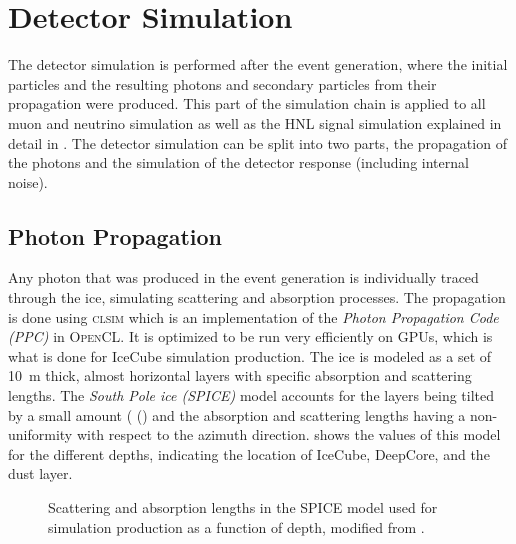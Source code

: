 \section{Detector Simulation}

The detector simulation is performed after the event generation, where the initial particles and the resulting photons and secondary particles from their propagation were produced. This part of the simulation chain is applied to all muon and neutrino simulation as well as the HNL signal simulation explained in detail in . The detector simulation can be split into two parts, the propagation of the photons and the simulation of the detector response (including internal noise).


\subsection{Photon Propagation} 

Any photon that was produced in the event generation is individually traced through the ice, simulating scattering and absorption processes.
The propagation is done using \textsc{clsim} \cite{clsim} which is an implementation of the \textit{Photon Propagation Code (\textsc{PPC})}  in \textsc{OpenCL}. It is optimized to be run very efficiently on GPUs, which is what is done for IceCube simulation production. The ice is modeled as a set of \SI{10}{\meter} thick, almost horizontal layers with specific absorption and scattering lengths. The \textit{South Pole ice (SPICE)} model  accounts for the layers being tilted by a small amount ( () and the absorption and scattering lengths having a non-uniformity with respect to the azimuth direction.  shows the values of this model for the different depths, indicating the location of IceCube, DeepCore, and the dust layer.

\begin{figure}
    
	\caption[Depth dependent scattering and absorption lengths]{Scattering and absorption lengths in the SPICE model used for simulation production as a function of depth, modified from \cite{ATrettin_phd}.}
\end{figure}

